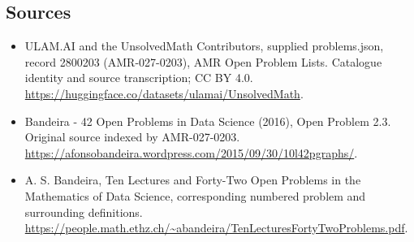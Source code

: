 \documentclass[11pt,a4paper]{article}
\begin{document}
\subsection{Sources}
\begin{itemize}
\item[S1] ULAM.AI and the UnsolvedMath Contributors, supplied problems.json, record 2800203 (AMR-027-0203), AMR Open Problem Lists. Catalogue identity and source transcription; CC BY 4.0.
\url{https://huggingface.co/datasets/ulamai/UnsolvedMath}.
\item[S2] Bandeira - 42 Open Problems in Data Science (2016), Open Problem 2.3. Original source indexed by AMR-027-0203.
\url{https://afonsobandeira.wordpress.com/2015/09/30/10l42pgraphs/}.
\item[S3] A. S. Bandeira, Ten Lectures and Forty-Two Open Problems in the Mathematics of Data Science, corresponding numbered problem and surrounding definitions.
\url{https://people.math.ethz.ch/~abandeira/TenLecturesFortyTwoProblems.pdf}.
\end{itemize}
\end{document}
